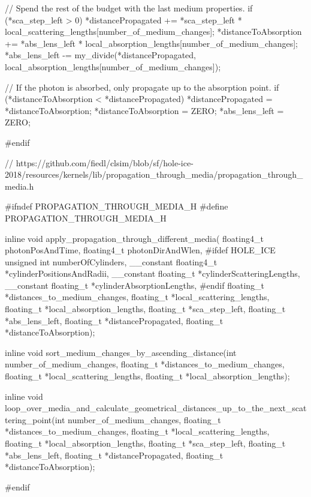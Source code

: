 \begin{ccode}
{  // Spend the rest of the budget with the last medium properties.
  if (*sca_step_left > 0) {
    *distancePropagated += *sca_step_left * local_scattering_lengths[number_of_medium_changes];
    *distanceToAbsorption += *abs_lens_left * local_absorption_lengths[number_of_medium_changes];
    *abs_lens_left -= my_divide(*distancePropagated, local_absorption_lengths[number_of_medium_changes]);
  }

  // If the photon is absorbed, only propagate up to the absorption point.
  if (*distanceToAbsorption < *distancePropagated) {
    *distancePropagated = *distanceToAbsorption;
    *distanceToAbsorption = ZERO;
    *abs_lens_left = ZERO;
  }
}

#endif
\end{ccode}

\begin{ccode}
// https://github.com/fiedl/clsim/blob/sf/hole-ice-2018/resources/kernels/lib/propagation_through_media/propagation_through_media.h

#ifndef PROPAGATION_THROUGH_MEDIA_H
#define PROPAGATION_THROUGH_MEDIA_H

inline void apply_propagation_through_different_media(
  floating4_t photonPosAndTime, floating4_t photonDirAndWlen,
  #ifdef HOLE_ICE
    unsigned int numberOfCylinders, __constant floating4_t *cylinderPositionsAndRadii,
    __constant floating_t *cylinderScatteringLengths, __constant floating_t *cylinderAbsorptionLengths,
  #endif
  floating_t *distances_to_medium_changes, floating_t *local_scattering_lengths, floating_t *local_absorption_lengths,
  floating_t *sca_step_left, floating_t *abs_lens_left,
  floating_t *distancePropagated, floating_t *distanceToAbsorption);

inline void sort_medium_changes_by_ascending_distance(int number_of_medium_changes, floating_t *distances_to_medium_changes, floating_t *local_scattering_lengths, floating_t *local_absorption_lengths);

inline void loop_over_media_and_calculate_geometrical_distances_up_to_the_next_scattering_point(int number_of_medium_changes, floating_t *distances_to_medium_changes, floating_t *local_scattering_lengths, floating_t *local_absorption_lengths, floating_t *sca_step_left, floating_t *abs_lens_left, floating_t *distancePropagated, floating_t *distanceToAbsorption);

#endif
\end{ccode}

